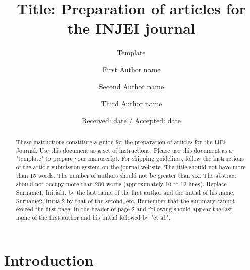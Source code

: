 \documentclass[twocolumn]{svClass}          %
\begin{document}
\title{Title: Preparation of articles for the INJEI journal}
\subtitle{Template}

\author{First Author name \and  Second Author name \and  Third Author name}


\date{Received: date / Accepted: date}


\maketitle

\begin{abstract}
These instructions constitute a guide for the preparation of articles for the IJEI Journal. Use this document as a set of instructions. Please use this document as a "template" to prepare your manuscript. For shipping guidelines, follow the instructions of the article submission system on the journal website. The title should not have more than 15 words. The number of authors should not be greater than six. The abstract should not occupy more than 200 words (approximately 10 to 12 lines). Replace Surname1, Initial1. by the last name of the first author and the initial of his name, Surname2, Initial2 by that of the second, etc. Remember that the summary cannot exceed the first page. In the header of page 2 and following should appear the last name of the first author and his initial followed by "et al.".

\end{abstract}

\section{Introduction}
\label{intro}
\end{document}
